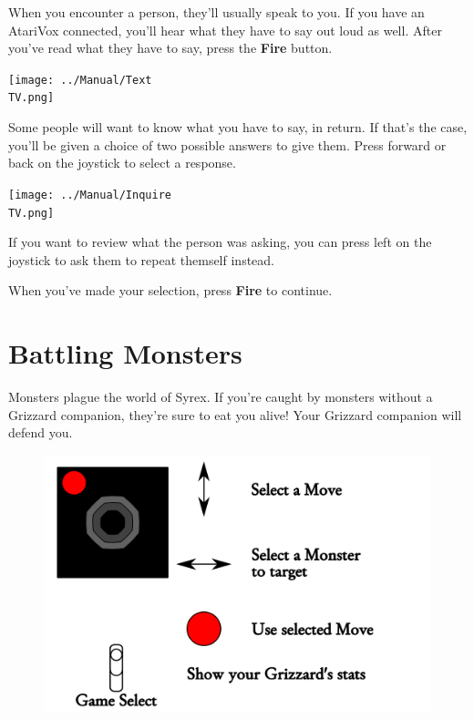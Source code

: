 \documentclass[10pt,twocolumn,openany,article]{memoir}
\newcommand\TV{NTSC}
\newcommand\TV{PAL}
\newcommand\TV{SECAM}
\begin{document}
When you encounter  a person, they'll usually speak to  you. If you have
an AtariVox  connected, you'll hear  what they have  to say out  loud as
well.   After  you've   read  what   they   have  to   say,  press   the
\textbf{Fire} button.

\begin{center}
  \texttt{[image: ../Manual/Text\\TV.png]}
\end{center}

Some people will want to know what you have to say, in return. If that's
the case, you'll be given a choice of two possible answers to give them.
Press forward or back on the joystick to select a response.

\begin{center}
  \texttt{[image: ../Manual/Inquire\\TV.png]}
\end{center}

If  you  want to  review  what  the person  was  asking,  you can  press
left on  the joystick to  ask them to repeat  themself instead.

When you've made your selection, press \textbf{Fire} to continue.

\section{Battling Monsters}

Monsters plague the world of Syrex. If you're caught by monsters without
a  Grizzard companion,  they're sure  to  eat you  alive! Your  Grizzard
companion will defend you.

\begin{figure}[ht]
  \includegraphics[width=2\columnwidth]{../Manual/CombatControls.png}
\end{figure}
\end{document}
